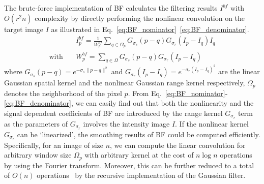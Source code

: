\documentclass[twocolumn]{el-author}
\begin{document}
The brute-force implementation of BF calculates the filtering results $I^{bf}$ with $O(r^2n)$ complexity by directly performing the nonlinear convolution on the target image $I$ as illustrated in Eq.~\eqref{eq:BF_nominator}~\eqref{eq:BF_denominator}.
%
\begin{align}
&I_p^{bf} = \frac{1}{W^{bf}_{p}} \sum_{q \in \Omega_p} G_{\sigma_s} (p-q) G_{\sigma_r} (I_p - I_q) I_q
\label{eq:BF_nominator} \\
\text{with} \quad & W^{bf}_{p} = \sum_{q \in \Omega} G_{\sigma_s} (p-q) G_{\sigma_r} (I_p - I_q)
\label{eq:BF_denominator}
\end{align}
%
where $G_{\sigma_s}(p-q) = e^{-\sigma_s{\|p-q\|^2}}$ and $G_{\sigma_r}(I_p - I_q) = e^{-{\sigma_r}{(I_p - I_q)^2}}$ are the linear Gaussian spatial kernel and the nonlinear Gaussian range kernel respectively, $\Omega_p$ denotes the neighborhood of the pixel $p$. From Eq.~\eqref{eq:BF_nominator}-\eqref{eq:BF_denominator}, we can easily find out that both the nonlinearity and the signal dependent coefficients of BF are introduced by the range kernel $G_{\sigma_r}$ term as the parameters of $G_{\sigma_r}$ involves the intensity image $I$. If the nonlinear kernel $G_{\sigma_r}$ can be `linearized', the smoothing results of BF could be computed efficiently. Specifically, for an image of size $n$, we can compute the linear convolution for arbitrary window size $\Omega_p$ with arbitrary kernel at the cost of $n \log n$ operations by using the Fourier transform. Moreover, this can be further reduced to a total of $O(n)$ operations~\cite{Young_SP_1995} by the recursive implementation of the Gaussian filter.
\end{document}
